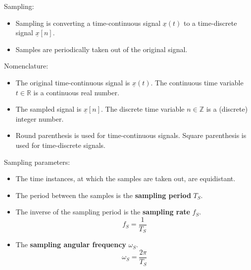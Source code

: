 \begin{refsection}
Sampling:
\begin{itemize}
	\item Sampling is converting a time-continuous signal $\underline{x}(t)$ to a time-discrete signal $\underline{x}[n]$.
	\item Samples are periodically taken out of the original signal.
\end{itemize}

Nomenclature:
\begin{itemize}
	\item The original time-continuous signal is $\underline{x}(t)$. The continuous time variable $t \in \mathbb{R}$ is a continuous real number.
	\item The sampled signal is $\underline{x}[n]$. The discrete time variable $n \in \mathbb{Z}$ is a (discrete) integer number.
	\item Round parenthesis is used for time-continuous signals. Square parenthesis is used for time-discrete signals.
\end{itemize}

Sampling parameters:
\begin{itemize}
	\item The time instances, at which the samples are taken out, are equidistant.
	\item The period between the samples is the  \textbf{sampling period} $T_S$.
	\item The inverse of the sampling period is the  \textbf{sampling rate} $f_S$.
	\begin{equation}
		f_S = \frac{1}{T_S}
	\end{equation}
	\item The  \textbf{sampling angular frequency} $\omega_S$.
	\begin{equation}
		\omega_S = \frac{2 \pi}{T_S}
	\end{equation}
\end{itemize}


\end{refsection}
